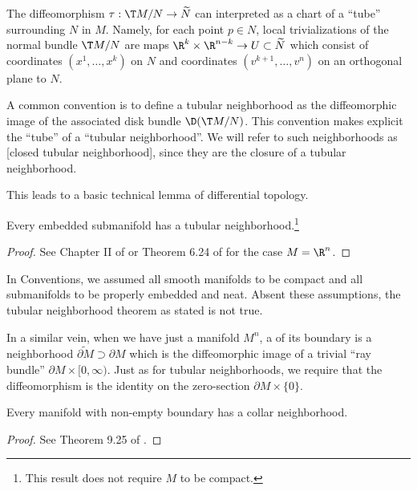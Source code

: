 The diffeomorphism $\tau : \T M/N \to \widetilde{N}$ can interpreted as a chart of a ``tube'' surrounding $N$ in $M$. Namely, for each point $p\in N$, local trivializations of the normal bundle $\T M/N$ are maps $\R^k \times \R^{n-k}\to U\subset \widetilde{N}$ which consist of coordinates $(x^1,\ldots,x^k)$ on $N$ and coordinates $(v^{k+1},\ldots, v^{n})$ on an orthogonal plane to $N$.

\begin{remark}
	A common convention is to define a tubular neighborhood as the diffeomorphic image of the associated disk bundle $\D(\T M/N)$. This convention makes explicit the ``tube'' of a  ``tubular neighborhood''. We will refer to such neighborhoods as [closed tubular neighborhood], since they are the closure of a tubular neighborhood.
\end{remark}

This leads to a basic technical lemma of differential topology.

\begin{theorem}\label{thm:tubular-neighborhood}
	Every embedded submanifold has a tubular neighborhood.\footnote{This result does not require $M$ to be compact.}
\end{theorem}
\begin{proof}
	See Chapter II of \cite{kosinski1993differential} or Theorem 6.24 of \cite{lee2013smooth} for the case $M=\R^n$.
\end{proof}

\begin{warning}
	In Conventions, we assumed all smooth manifolds to be compact and all submanifolds to be properly embedded and neat. Absent these assumptions, the tubular neighborhood theorem as stated is not true.
\end{warning}

In a similar vein, when we have just a manifold $M^n$, a  of its boundary is a neighborhood $\widetilde{\partial M}\supset \partial M$ which is the diffeomorphic image of a trivial ``ray bundle'' $\partial M\times [0,\infty)$. Just as for tubular neighborhoods, we require that the diffeomorphism is the identity on the zero-section $\partial M\times\{0\}$.

\begin{theorem}\label{thm:collar-neighborhood}
	Every manifold with non-empty boundary has a collar neighborhood.
\end{theorem}
\begin{proof}
	See Theorem 9.25 of \cite{lee2013smooth}.
\end{proof}

